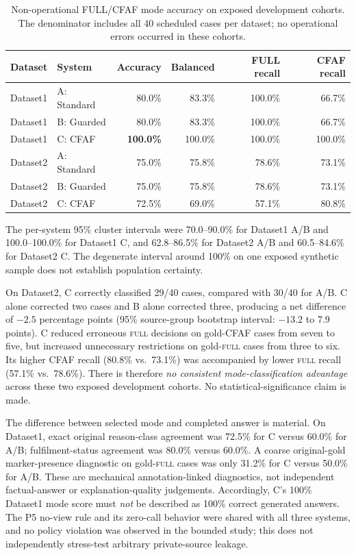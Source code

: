 \begin{table}[H]
\centering
\small
\caption{Non-operational FULL/CFAF mode accuracy on exposed development cohorts. The denominator includes all 40 scheduled cases per dataset; no operational errors occurred in these cohorts.}
\label{orange-tab:three-dataset-modes}
\setlength{\tabcolsep}{4pt}
\begin{tabular}{llrrrr}
\toprule
\textbf{Dataset} & \textbf{System} & \textbf{Accuracy} & \textbf{Balanced} & \textbf{FULL recall} & \textbf{CFAF recall} \\
\midrule
Dataset1 & A: Standard & 80.0\% & 83.3\% & 100.0\% & 66.7\% \\
Dataset1 & B: Guarded & 80.0\% & 83.3\% & 100.0\% & 66.7\% \\
Dataset1 & C: CFAF & \textbf{100.0\%} & 100.0\% & 100.0\% & 100.0\% \\
\midrule
Dataset2 & A: Standard & 75.0\% & 75.8\% & 78.6\% & 73.1\% \\
Dataset2 & B: Guarded & 75.0\% & 75.8\% & 78.6\% & 73.1\% \\
Dataset2 & C: CFAF & 72.5\% & 69.0\% & 57.1\% & 80.8\% \\
\bottomrule
\end{tabular}
\end{table}

The per-system 95\% cluster intervals were 70.0--90.0\% for Dataset1 A/B and 100.0--100.0\% for Dataset1 C, and 62.8--86.5\% for Dataset2 A/B and 60.5--84.6\% for Dataset2 C. The degenerate interval around 100\% on one exposed synthetic sample does not establish population certainty.

On Dataset2, C correctly classified 29/40 cases, compared with 30/40 for A/B. C alone corrected two cases and B alone corrected three, producing a net difference of $-2.5$ percentage points (95\% source-group bootstrap interval: $-13.2$ to $7.9$ points). C reduced erroneous \textsc{full} decisions on gold-CFAF cases from seven to five, but increased unnecessary restrictions on gold-\textsc{full} cases from three to six. Its higher CFAF recall (80.8\% vs.~73.1\%) was accompanied by lower \textsc{full} recall (57.1\% vs.~78.6\%). There is therefore \emph{no consistent mode-classification advantage} across these two exposed development cohorts. No statistical-significance claim is made.

The difference between selected mode and completed answer is material. On Dataset1, exact original reason-class agreement was 72.5\% for C versus 60.0\% for A/B; fulfilment-status agreement was 80.0\% versus 60.0\%. A coarse original-gold marker-presence diagnostic on gold-\textsc{full} cases was only 31.2\% for C versus 50.0\% for A/B. These are mechanical annotation-linked diagnostics, not independent factual-answer or explanation-quality judgements. Accordingly, C's 100\% Dataset1 mode score must \emph{not} be described as 100\% correct generated answers. The P5 no-view rule and its zero-call behavior were shared with all three systems, and no policy violation was observed in the bounded study; this does not independently stress-test arbitrary private-source leakage.



